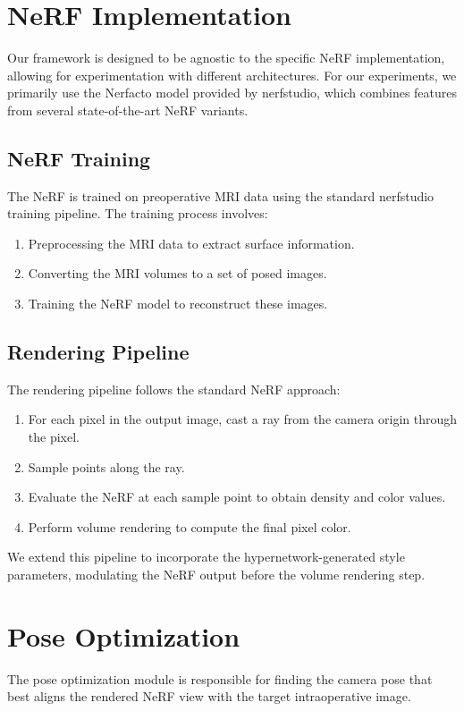\section{NeRF Implementation}
Our framework is designed to be agnostic to the specific NeRF implementation, allowing for experimentation with different architectures. For our experiments, we primarily use the Nerfacto model provided by nerfstudio, which combines features from several state-of-the-art NeRF variants.

\subsection{NeRF Training}
The NeRF is trained on preoperative MRI data using the standard nerfstudio training pipeline. The training process involves:

\begin{enumerate}
    \item Preprocessing the MRI data to extract surface information.
    \item Converting the MRI volumes to a set of posed images.
    \item Training the NeRF model to reconstruct these images.
\end{enumerate}

\subsection{Rendering Pipeline}
The rendering pipeline follows the standard NeRF approach:

\begin{enumerate}
    \item For each pixel in the output image, cast a ray from the camera origin through the pixel.
    \item Sample points along the ray.
    \item Evaluate the NeRF at each sample point to obtain density and color values.
    \item Perform volume rendering to compute the final pixel color.
\end{enumerate}

We extend this pipeline to incorporate the hypernetwork-generated style parameters, modulating the NeRF output before the volume rendering step.

\section{Pose Optimization}
The pose optimization module is responsible for finding the camera pose that best aligns the rendered NeRF view with the target intraoperative image.

